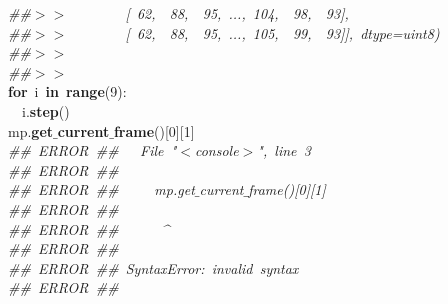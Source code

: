 \mbox{}\textit{\#\#$>$$>$\ \ \ \ \ \ \ \ [\ 62,\ \ 88,\ \ 95,\ ...,\ 104,\ \ 98,\ \ 93],} \\
\mbox{}\textit{\#\#$>$$>$\ \ \ \ \ \ \ \ [\ 62,\ \ 88,\ \ 95,\ ...,\ 105,\ \ 99,\ \ 93]],\ dtype=uint8)} \\
\mbox{}\textit{\#\#$>$$>$\ } \\
\mbox{}\textit{\#\#$>$$>$\ } \\
\mbox{}\textbf{for}\ i\ \textbf{in}\ \textbf{range}(9): \\
\mbox{}\ \ i.\textbf{step}() \\
\mbox{}mp.\textbf{get$\_$current$\_$frame}()[0][1] \\
\mbox{}\textit{\#\#\ ERROR\ \#\#\ \ \ File\ "{}$<$console$>$"{},\ line\ 3} \\
\mbox{}\textit{\#\#\ ERROR\ \#\#\ } \\
\mbox{}\textit{\#\#\ ERROR\ \#\#\ \ \ \ \ mp.get$\_$current$\_$frame()[0][1]} \\
\mbox{}\textit{\#\#\ ERROR\ \#\#\ } \\
\mbox{}\textit{\#\#\ ERROR\ \#\#\ \ \ \ \ \ \textasciicircum{}} \\
\mbox{}\textit{\#\#\ ERROR\ \#\#\ } \\
\mbox{}\textit{\#\#\ ERROR\ \#\#\ SyntaxError:\ invalid\ syntax} \\
\mbox{}\textit{\#\#\ ERROR\ \#\#\ } \\
\mbox{} \\
\mbox{}
